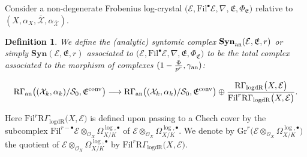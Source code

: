 \documentclass[asterisque,english]{smfart}
\newtheorem{definition}{Definition}[]
\begin{document}
Consider a non-degenerate Frobenius log-crystal  $ \bigl(\mathcal{E},\mathrm{Fil}^\bullet \mathcal{E}, \nabla,\mathfrak{E},\Phi_{\mathfrak{E}}\bigr)$
relative to $(X,\alpha_X,\overline{\mathcal{X}},\alpha_{\overline{\mathcal{X}}})$.



\begin{definition}\label{def:syntomiccomplex} We define the (analytic) syntomic complex $\mathbf{Syn}_{\rm an}(\mathcal{E},\mathfrak{E},r)$ or simply $\mathbf{Syn}(\mathcal{E},\mathfrak{E},r)$ associated to $ \bigl(\mathcal{E},\mathrm{Fil}^\bullet \mathcal{E}, \nabla,\mathfrak{E},\Phi_{\mathfrak{E}}\bigr)$ to be the total complex associated to the morphism  of complexes $(1-\frac{\Phi}{p^r},\gamma_{\rm an})$:

$$\mathrm{R}\Gamma_{\mathrm{an}}\bigl((\mathcal{X}_k,\alpha_k)/\mathcal{S}_0,\mathfrak{E}^{\rm conv}\bigr) \longrightarrow \mathrm{R}\Gamma_{\mathrm{an}}\bigl((\mathcal{X}_k,\alpha_k)/\mathcal{S}_0,\mathfrak{E}^{\rm conv}\bigr) \oplus \frac{ \mathrm{R}\Gamma_{\mathrm{logdR}}\bigl(X, \mathcal{E}\bigr) }{\mathrm{Fil}^r \mathrm{R}\Gamma_{\mathrm{logdR}}\bigl(X, \mathcal{E}\bigr)}.$$

\end{definition}

Here $\mathrm{Fil}^r \mathrm{R}\Gamma_{\mathrm{logdR}}\bigl(X, \mathcal{E}\bigr)$ is defined upon passing to a Chech cover by the subcomplex $\mathrm{Fil}^{r-\bullet} \mathcal{E} \otimes_{\mathcal{O}_X}  \Omega_{X/K}^{\log,\bullet}$ of $\mathcal{E} \otimes_{\mathcal{O}_X}  \Omega_{X/K}^{\log,\bullet}$. We denote by $\mathrm{Gr}^r \bigl(\mathcal{E} \otimes_{\mathcal{O}_X}  \Omega_{X/K}^{\log,\bullet}\bigr)$ the quotient of  $\mathcal{E} \otimes_{\mathcal{O}_X}  \Omega_{X/K}^{\log,\bullet}$
by  $\mathrm{Fil}^r \mathrm{R}\Gamma_{\mathrm{logdR}}\bigl(X, \mathcal{E}\bigr)$. 
\end{document}
